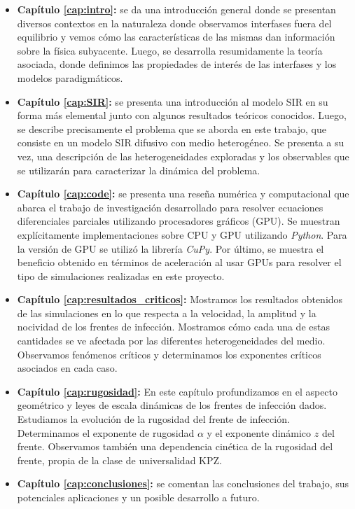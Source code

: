 \begin{itemize}
    \item \textbf{Capítulo \ref{cap:intro}:} se da una introducción general donde se presentan diversos contextos en la naturaleza donde observamos interfases fuera del equilibrio y vemos cómo las características de las mismas dan información sobre la física subyacente. Luego, se desarrolla resumidamente la teoría asociada, donde definimos las propiedades de interés de las interfases y los modelos paradigmáticos.
    \item \textbf{Capítulo \ref{cap:SIR}:} se presenta una introducción al modelo SIR en su forma más elemental junto con algunos resultados teóricos conocidos. Luego, se describe precisamente el problema que se aborda en este trabajo, que consiste en un modelo SIR difusivo con medio heterogéneo. Se presenta a su vez, una descripción de las heterogeneidades exploradas y los observables que se utilizarán para caracterizar la dinámica del problema.
    \item \textbf{Capítulo \ref{cap:code}:} se presenta una reseña numérica y computacional que abarca el trabajo de investigación desarrollado para resolver ecuaciones diferenciales parciales utilizando procesadores gráficos (GPU). Se muestran explícitamente implementaciones sobre CPU y GPU utilizando \textit{Python}. Para la versión de GPU se utilizó la librería \textit{CuPy}. Por último, se muestra el beneficio obtenido en términos de aceleración al usar GPUs para resolver el tipo de simulaciones realizadas en este proyecto.
    \item \textbf{Capítulo \ref{cap:resultados_criticos}:} Mostramos los resultados obtenidos de las simulaciones en lo que respecta a la velocidad, la amplitud y la nocividad de los frentes de infección. Mostramos cómo cada una de estas cantidades se ve afectada por las diferentes heterogeneidades del medio. Observamos fenómenos críticos y determinamos los exponentes críticos asociados en cada caso.
    \item \textbf{Capítulo \ref{cap:rugosidad}:} En este capítulo profundizamos en el aspecto geométrico y leyes de escala dinámicas  de los frentes de infección dados. Estudiamos la evolución de la rugosidad del frente de infección. Determinamos el exponente de rugosidad $\alpha$ y el exponente dinámico $z$ del frente. Observamos también una dependencia cinética de la rugosidad del frente, propia de la clase de universalidad KPZ. 
    \item \textbf{Capítulo \ref{cap:conclusiones}:} se comentan las conclusiones del trabajo, sus potenciales aplicaciones y un posible desarrollo a futuro.
\end{itemize}